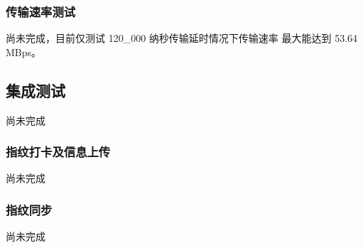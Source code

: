     \subsubsection{传输速率测试}

    尚未完成，目前仅测试 120\_000 纳秒传输延时情况下传输速率
    最大能达到 53.64 MBps。

    \subsection{集成测试}

    尚未完成

    \subsubsection{指纹打卡及信息上传}

    尚未完成

    \subsubsection{指纹同步}

    尚未完成